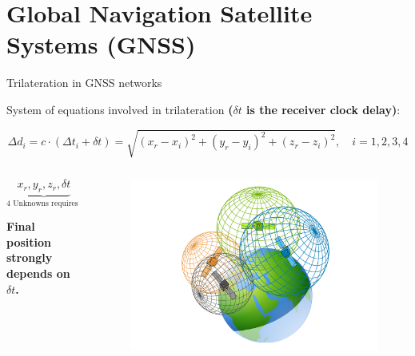 \section{Global Navigation Satellite Systems (GNSS)}

\begin{frame}{Trilateration in GNSS networks}

    System of equations involved in trilateration \textbf{($\delta t$ is the receiver clock delay)}:

    \begin{equation*}
        \Delta d_i = c \cdot (\Delta t_i + \delta t) = \sqrt{(x_r - x_i)^2 + (y_r - y_i)^2 + (z_r - z_i)^2}, \quad i = 1, 2, 3, 4
    \end{equation*}

    \begin{columns}[c, onlytextwidth]

        \begin{column}{0.6\textwidth}

            \begin{equation*}
                \underbrace{x_r, y_r, z_r, \delta t}_\text{4 Unknowns requires 4 satellites}
            \end{equation*}

            \vspace{10pt}

            \textbf{Final position strongly depends on $\delta t$.}

        \end{column}

        \begin{column}{0.4\textwidth}

            \begin{figure}[H]
                \centering
                \includegraphics[width=\textwidth]{img/GPS-Trilateration.png}
            \end{figure}

        \end{column}

    \end{columns}


\end{frame}
